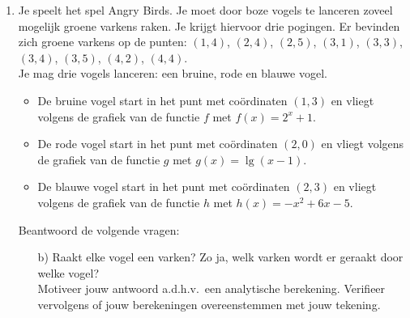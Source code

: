 \begin{frame}
\small{
\begin{enumerate}
\item<+->[3]
Je speelt het spel Angry Birds. Je moet door boze vogels te lanceren zoveel mogelijk groene varkens raken. Je krijgt hiervoor drie pogingen. Er bevinden zich groene varkens op de punten: $(1,4)$, $(2,4)$, $(2,5)$, $(3,1)$, $(3,3)$, $(3,4)$, $(3,5)$, $(4,2)$, $(4,4)$. \\
Je mag drie vogels lanceren: een bruine, rode en blauwe vogel. 
\begin{itemize}
\item De bruine vogel start in het punt met co\"ordinaten $(1,3)$ en vliegt volgens de grafiek van de functie $f$ met $f(x)= 2^x+1$.
\item De rode vogel start in het punt met co\"ordinaten $(2,0)$ en vliegt volgens de grafiek van de functie $g$ met $g(x)=\lg (x-1)$.
\item De blauwe vogel start in het punt met co\"ordinaten $(2,3)$ en vliegt volgens de grafiek van de functie $h$ met $h(x)=-x^2+6x-5$.
\end{itemize}

Beantwoord de volgende vragen:
\begin{enumerate}
\item[b)] Raakt elke vogel een varken? Zo ja, welk varken wordt er geraakt door welke vogel? \\
Motiveer jouw antwoord a.d.h.v.\ een analytische berekening. Verifieer vervolgens of jouw berekeningen overeenstemmen met jouw tekening.
\end{enumerate}
\end{enumerate}}
\end{frame}

